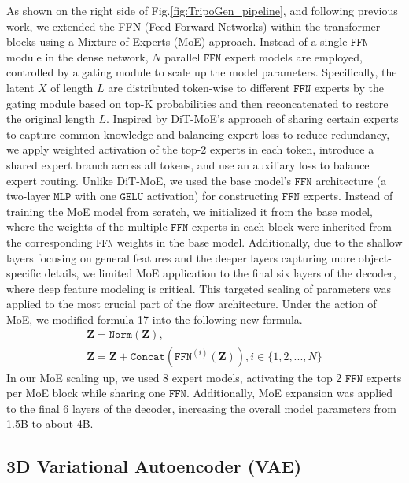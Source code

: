 As shown on the right side of Fig.\ref{fig:TripoGen_pipeline}, and following previous work\cite{riquelme2021scaling,fei2024scaling}, we extended the FFN (Feed-Forward Networks) within the transformer blocks using a Mixture-of-Experts (MoE) approach. Instead of a single $\mathtt{FFN}$ module in the dense network, $N$ parallel $\mathtt{FFN}$ expert models are employed, controlled by a gating module to scale up the model parameters. Specifically, the latent $X$ of length $L$ are distributed token-wise to different $\mathtt{FFN}$ experts by the gating module based on top-K probabilities and then reconcatenated to restore the original length $L$.
Inspired by DiT-MoE\cite{fei2024scaling}’s approach of sharing certain experts to capture common knowledge and balancing expert loss to reduce redundancy, we apply weighted activation of the top-2 experts in each token, introduce a shared expert branch across all tokens, and use an auxiliary loss to balance expert routing. 
Unlike DiT-MoE, we used the base model’s $\mathtt{FFN}$ architecture (a two-layer $\mathtt{MLP}$ with one $\mathtt{GELU}$ activation) for constructing $\mathtt{FFN}$ experts. 
Instead of training the MoE model from scratch, 
we initialized it from the base model, where the weights of the multiple $\mathtt{FFN}$ experts in each block were inherited from the corresponding $\mathtt{FFN}$ weights in the base model. Additionally, due to the shallow layers focusing on general features and the deeper layers capturing more object-specific details\cite{zeiler2014visualizing}, we limited MoE application to the final six layers of the decoder, where deep feature modeling is critical. 
This targeted scaling of parameters was applied to the most crucial part of the flow architecture. Under the action of MoE, we modified formula 17 into the following new formula.
\begin{gather}
\mathbf{Z}=\mathtt{Norm}\left(\mathbf{Z}\right), \\
\mathbf{Z}=\mathbf{Z} + \mathtt{Concat}\left(\mathtt{FFN}^{\left(i\right)}\left(\mathbf{Z}\right)\right), 
i \in \{1,2,...,N\}
\end{gather}
In our MoE scaling up, we used 8 expert models, activating the top 2 $\mathtt{FFN}$ experts per MoE block while sharing one $\mathtt{FFN}$. Additionally, MoE expansion was applied to the final 6 layers of the decoder, increasing the overall model parameters from 1.5B to about 4B.



\subsection{3D Variational Autoencoder (VAE)}\label{sec:vae}
